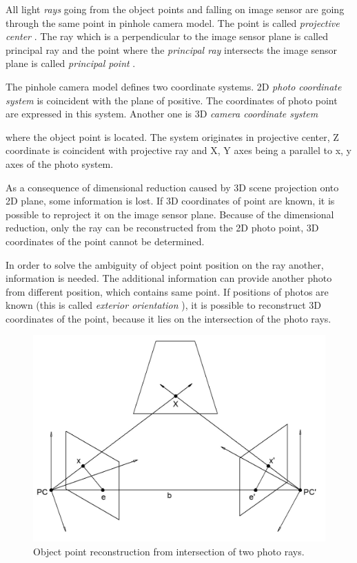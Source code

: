 \documentclass[a4paper,12pt]{article}
\newcommand{\term}[1]{
{\it #1}%
}
\begin{document}

All light \term{rays} going from the object points and falling on image sensor are going through the same point in pinhole camera model.
The point is called \term{projective center}. The ray which is a perpendicular to the image sensor plane is called principal ray and the point 
where the \term{principal ray} intersects the image sensor plane is called \term{principal point}.

The pinhole camera model defines two coordinate systems. 2D  \term{photo coordinate system} is coincident
with the plane of positive.
The coordinates of photo point are expressed in this system. Another one is 3D \term{camera coordinate system}
where the object point is located. The system originates in projective center, Z coordinate 
 is coincident with projective ray and X, Y axes being a parallel to x, y axes of the photo system.

 
As a consequence of dimensional reduction caused by 
3D scene projection onto 2D plane, some information is lost.
If 3D coordinates of point are known, it is possible to reproject it on the image sensor plane. Because 
of the dimensional reduction,  only the ray can be reconstructed from the 2D photo point,
3D coordinates of the point cannot be determined.

In order to solve the ambiguity of object point position on the ray another, information is needed.  
The additional information can provide another photo from different position, which contains same point. 
If positions of photos 
 are known (this is called\term{ exterior orientation}), it is possible 
to reconstruct 3D coordinates of the point, because it lies on the intersection of the photo rays.


\begin{figure}[h]
    \centering
    \includegraphics[scale=0.2]{figures/object_point_intersection.png}
    \caption{Object point reconstruction from intersection of two photo rays.}
    \label{fig:obj_intersec}
\end{figure}
\end{document}
